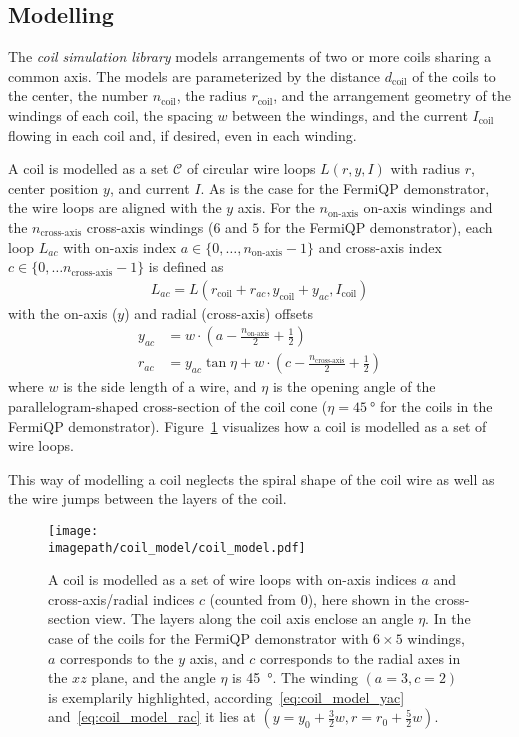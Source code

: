 \subsection*{Modelling}
The \textit{coil simulation library} models arrangements of two or more coils sharing a common axis. The models are parameterized by the distance $d_\text{coil}$ of the coils to the center, the number $n_\text{coil}$, the radius $r_\text{coil}$, and the arrangement geometry of the windings of each coil, the spacing $w$ between the windings, and the current $I_\text{coil}$ flowing in each coil and, if desired, even in each winding.

A coil is modelled as a set $\mathcal{C}$ of circular wire loops $L(r, y, I)$ with radius $r$, center position $y$, and current $I$. As is the case for the FermiQP demonstrator, the wire loops are aligned with the $y$ axis. For the $n_\text{on-axis}$ on-axis windings and the $n_\text{cross-axis}$ cross-axis windings ($6$ and $5$ for the FermiQP demonstrator), each loop $L_{ac}$ with on-axis index $a \in \{0, \ldots, n_\text{on-axis} - 1\}$ and cross-axis index $c \in \{0, \ldots n_\text{cross-axis} - 1\}$ is defined as
\begin{align}
    L_{ac} = L \left(r_\text{coil} + r_{ac}, y_\text{coil} + y_{ac}, I_\text{coil}\right)
\end{align}
with the on-axis ($y$) and radial (cross-axis) offsets
\begin{align}
    \label{eq:coil_model_yac}
    y_{ac} &= w\cdot \left(a-\frac{n_\text{on-axis}}{2} + \frac{1}{2}\right) \\
    \label{eq:coil_model_rac}
    r_{ac} &= y_{ac} \tan \eta + w \cdot \left(c - \frac{n_\text{cross-axis}}{2} + \frac{1}{2}\right)
\end{align}
where $w$ is the side length of a wire, and $\eta$ is the opening angle of the parallelogram-shaped cross-section of the coil cone ($\eta = \SI{45}{\degree}$ for the coils in the FermiQP demonstrator). Figure~\ref{fig:coil_model} visualizes how a coil is modelled as a set of wire loops.

This way of modelling a coil neglects the spiral shape of the coil wire as well as the wire jumps between the layers of the coil.

\begin{figure}
    \centering
    \texttt{[image: \\imagepath/coil\_model/coil\_model.pdf]}
    \caption{A coil is modelled as a set of wire loops with on-axis indices $a$ and cross-axis/radial indices $c$ (counted from $0$), here shown in the cross-section view. The layers along the coil axis enclose an angle $\eta$. In the case of the coils for the FermiQP demonstrator with $6 \times 5$ windings, $a$ corresponds to the $y$ axis, and $c$ corresponds to the radial axes in the $xz$ plane, and the angle $\eta$ is \SI[]{45}{\degree}. The winding $(a = 3, c=2)$ is exemplarily highlighted, according~\eqref{eq:coil_model_yac} and~\eqref{eq:coil_model_rac} it lies at $(y = y_0 + \frac{3}{2}w, r = r_0 + \frac{5}{2}w)$.}
    \label{fig:coil_model}
\end{figure}

